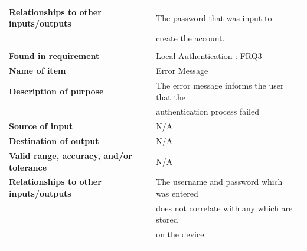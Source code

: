 \begin{tabular}{ll}
\textbf{Relationships to other inputs/outputs}&The password that was input to\\& create the account.\\
&\\
\textbf{Found in requirement}&Local Authentication : FRQ3\\
\textbf{Name of item}&Error Message\\
\textbf{Description of purpose}&The error message informs the user that the\\& authentication process failed\\
\textbf{Source of input}&N/A\\
\textbf{Destination of output}&N/A\\
\textbf{Valid range, accuracy, and/or tolerance}&N/A\\
\textbf{Relationships to other inputs/outputs}&The username and password which was entered\\&does not correlate with any which are stored\\& on the device.\\
&\\
\end{tabular}
\newpage
